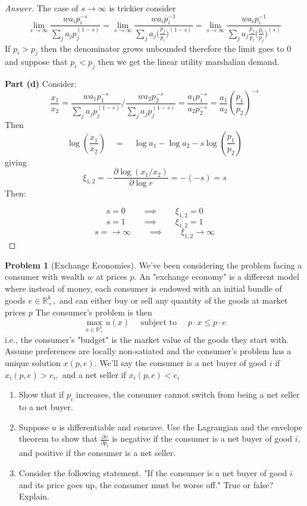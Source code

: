 \documentclass{article}
\theoremstyle{definition}
\newtheorem{problem}{Problem}
\newcommand{\qiq}{\qquad \implies \qquad}
\begin{document}
\begin{proof}[Answer]
The case of $s\to \infty$ is trickier consider
$$\lim_{s\rightarrow \infty}{\frac{w a_{i} p_{i}^{-s}}{\sum_{j} a_{j} p_{j}^{(1-s)}}} =\lim_{s\rightarrow \infty}{\frac{w a_{i} p_{i}^{-1}}{\sum_{j} a_{j} \Big(\frac{p_{j}}{p_{i}}\Big)^{(1-s)}}} =\lim_{s\rightarrow \infty}{\frac{w a_{i} p_{i}^{-1}}{\sum_{j} a_{j} \frac{p_{j}}{p_{i}}\Big(\frac{p_{i}}{p_{j}}\Big)^{(s)}}} $$
If $p_i>p_j$ then the denominator grows unbounded therefore the limit goes to $0$ and suppose that $p_i<p_j$ then we get the linear utility marshalian demand.

\textbf{Part (d)}
Consider:
$$\frac{x_1}{x_2} =\frac{w a_{1} p_{1}^{-s}}{\sum_{j} a_{j} p_{j}^{(1-s)}} \big/ \frac{w a_{2} p_{2}^{-s}}{\sum_{j} a_{j} p_{j}^{(1-s)}} = \frac{a_{1} p_{1}^{-s}}{a_{2} p_{2}^{-s}} =  \frac{a_{1}}{a_{2}}\left(\frac{p_{1}}{p_{2}}\right)^{-s}$$
Then
$$
\log \left(\frac{x_{1}}{x_{2}}\right) \quad=\quad \log a_{1}-\log a_{2}-s \log \left(\frac{p_{1}}{p_{2}}\right)
$$
giving
$$
\xi_{1,2}=-\frac{\partial \log \left(x_{1} / x_{2}\right)}{\partial \log r}=-(-s)=s
$$
Then:

$$s= 0 \qiq \xi_{1,2} = 0$$
$$s= 1 \qiq \xi_{1,2} = 1$$
$$s= \to \infty \qiq \xi_{1,2} \to \infty$$
\end{proof}


\begin{problem}[Exchange Economies]
We've been considering the problem facing a consumer with wealth $w$ at prices $p .$ An "exchange economy" is a different model where instead of money, each consumer is endowed with an initial bundle of goods $e \in \mathbb{R}_{+}^{k},$ and can either buy or sell any quantity of the goods at market prices $p$
The consumer's problem is then
$$
\max _{x \in \mathbb{R}_{+}^{k}} u(x) \quad \text { subject to } \quad p \cdot x \leq p \cdot e
$$
i.e., the consumer's "budget" is the market value of the goods they start with.
Assume preferences are locally non-satiated and the consumer's problem has a unique solution
$x(p, e) .$ We'll say the consumer is a net buyer of good $i$ if $x_{i}(p, e)>e_{i},$ and a net seller if $x_{i}(p, e)<e_{i}$
\begin{enumerate}[a]
    \item Show that if $p_{i}$ increases, the consumer cannot switch from being a net seller to a net buyer.
    \item Suppose $u$ is differentiable and concave. Use the Lagrangian and the envelope theorem to show that $\frac{\partial v}{\partial p_{i}}$ is negative if the consumer is a net buyer of good $i,$ and positive if the consumer is a net seller.
    \item  Consider the following statement. "If the consumer is a net buyer of good $i$ and its price goes up, the consumer must be worse off." True or false? Explain.
\end{enumerate}
\end{problem}
\end{document}
